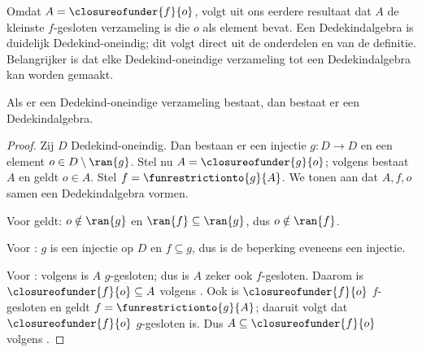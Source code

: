\documentclass[openany]{memoir}
\begin{document}
Omdat $A = \closureofunder{f}{o}$, volgt uit ons eerdere resultaat dat
$A$ de kleinste $f$-gesloten verzameling is die $o$ als element bevat.
Een Dedekindalgebra is duidelijk Dedekind-oneindig; dit volgt direct
uit de onderdelen  en  van de
definitie. Belangrijker is dat elke Dedekind-oneindige verzameling tot
een Dedekindalgebra kan worden gemaakt.

\begin{thm}
Als er een Dedekind-oneindige verzameling bestaat, dan bestaat er een
Dedekindalgebra.
\end{thm}

\begin{proof}
Zij $D$ Dedekind-oneindig. Dan bestaan er een injectie $g \colon D \to
D$ en een element $o \in D \setminus \ran{g}$. Stel nu $A =
\closureofunder{g}{o}$; volgens  bestaat $A$
en geldt $o \in A$. Stel $f = \funrestrictionto{g}{A}$. We tonen aan
dat $A, f, o$ samen een Dedekindalgebra vormen.

Voor  geldt: $o \notin \ran{g}$ en $\ran{f}
\subseteq \ran{g}$, dus $o\notin \ran{f}$.

Voor : $g$ is een injectie op $D$ en $f
\subseteq g$, dus is de beperking eveneens een injectie.

Voor : volgens  is $A$
$g$-gesloten; dus is $A$ zeker ook $f$-gesloten. Daarom is
$\closureofunder{f}{o} \subseteq A$ volgens
. Ook is $\closureofunder{f}{o}$
$f$-gesloten en geldt $f = \funrestrictionto{g}{A}$; daaruit volgt dat
$\closureofunder{f}{o}$ $g$-gesloten is. Dus
$A \subseteq \closureofunder{f}{o}$ volgens
.
\end{proof}
\endgroup

\begingroup
\def\olfilename{OLP-0052}
\def\olfilepath{content/sets-functions-relations/infinite/}
\hypertarget{unit-OLP-0052}{}
\end{document}
